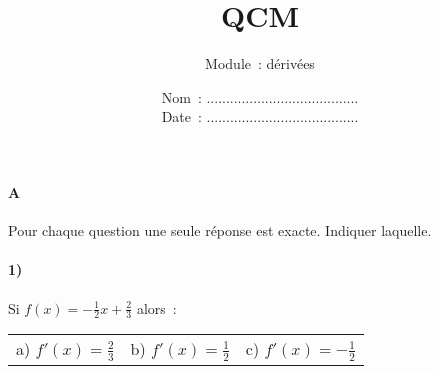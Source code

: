 \documentclass[a4paper]{article}
\begin{document}
  \title{QCM}
  \author{Module~: dérivées}
  \date{
    Nom~: .......................................\\
    \vspace{0.2cm}
    Date~: .......................................}
  \maketitle
  
  \paragraph{A}
  Pour chaque question une seule réponse est exacte. Indiquer laquelle.
  \paragraph{1)}
  Si $f(x) = - \frac{1}{2} x + \frac{2}{3}$ alors~:

  \begin{center}
    \begin{tabular}{p{3cm}p{3cm}p{3cm}}
      a) $f'(x) = \frac{2}{3}$ & b) $f'(x) = \frac{1}{2}$ & c) $f'(x) = - \frac{1}{2}$
    \end{tabular}
  \end{center}
\end{document}
